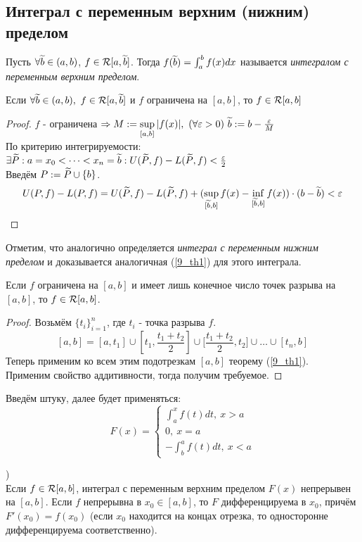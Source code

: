 \subsection{Интеграл с переменным верхним (нижним) пределом}
\begin{definition}
	Пусть $\forall\widetilde b\in(a,b)$, $f\in\mathcal R[a,\widetilde b]$. Тогда $f(\widetilde b)=\int_a^bf(x)dx$ называется \textit{интегралом с переменным верхним пределом}.
\end{definition}
\begin{theorem}\label{9_th1}
	Если $\forall\widetilde b\in(a,b),\ f\in\mathcal R[a,\widetilde b]$ и $f$ ограничена на $[a,b]$, то $f\in\mathcal R[a,b]$
\end{theorem}
\begin{proof}
	$f$ - ограничена $\Ra M:=\sup_{[a,b]}|f(x)|,\ (\fa\eps>0)\ \t b:=b-\frac\eps M$\\
	По критерию интегрируемости: $\exists\widetilde P:a=x_0<\dots<x_n=\widetilde b:U(\widetilde P,f)-L(\widetilde P,f)<\frac{\varepsilon}2$\\
	Введём $P:=\widetilde P\cup\{b\}$.
	\[U(P,f)-L(P,f)=U(\t P,f)-L(\t P,f)+(\sup_{[\t b,b]}f(x)-\inf_{[\t b,b]}f(x))\cdot(b-\t b)<\eps\]
\end{proof}
\begin{note}
	Отметим, что аналогично определяется \textit{интеграл с переменным нижним пределом} и доказывается аналогичная (\ref{9_th1}) для этого интеграла.
\end{note}
\begin{corollary}
	Если $f$ ограничена на $[a,b]$ и имеет лишь конечное число точек разрыва на $[a,b]$, то $f\in\mathcal R[a,b]$.
\end{corollary}
\begin{proof}
	Возьмём $\{t_i\}_{i=1}^n$, где $t_i$ - точка разрыва $f$.\\
	\[[a,b]=[a,t_1]\cup\left[t_1,\frac{t_1+t_2}2\right]\cup\bigg[\frac{t_1+t_2}2,t_2\bigg]\cup\dots\cup[t_n,b]\]
	Теперь применим ко всем этим подотрезкам $[a,b]$ теорему (\ref{9_th1}).\\
	Применим свойство аддитивности, тогда получим требуемое.
\end{proof}
\begin{note}
	Введём штуку, далее будет применяться:
	\[
	F(x)=
	\begin{cases}
		\int_a^xf(t)dt,\ x>a\\
		0,\ x=a\\
		-\int_b^af(t)dt,\ x<a
	\end{cases}
	\]
\end{note}
\begin{theorem}\nf{([Свойства интеграла с переменным верхним пределом})\label{9_th2}\\
	Если $f\in\mathcal R[a,b]$, интеграл с переменным верхним пределом $F(x)$ непрерывен на $[a,b]$. Если $f$ непрерывна в $x_0\in[a,b]$, то $F$ дифференцируема в $x_0$, причём $F'(x_0)=f(x_0)$ (если $x_0$ находится на концах отрезка, то односторонне дифференцируема соответственно).
\end{theorem}
